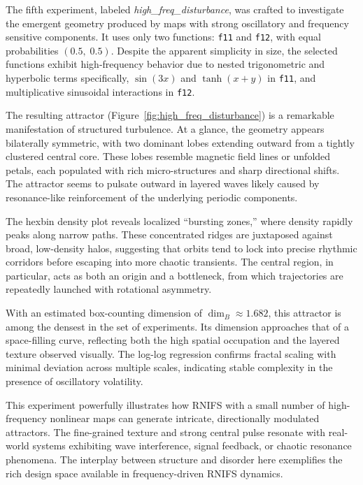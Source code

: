 \documentclass[twocolumn,10pt]{article}
\begin{document}
The fifth experiment, labeled \textit{high\_freq\_disturbance}, was crafted to investigate the emergent geometry produced by maps with strong oscillatory and frequency sensitive components. It uses only two functions: \texttt{f11} and \texttt{f12}, with equal probabilities $(0.5,\; 0.5)$. Despite the apparent simplicity in size, the selected functions exhibit high-frequency behavior due to nested trigonometric and hyperbolic terms specifically, $\sin(3x)$ and $\tanh(x + y)$ in \texttt{f11}, and multiplicative sinusoidal interactions in \texttt{f12}.

The resulting attractor (Figure~\ref{fig:high_freq_disturbance}) is a remarkable manifestation of structured turbulence. At a glance, the geometry appears bilaterally symmetric, with two dominant lobes extending outward from a tightly clustered central core. These lobes resemble magnetic field lines or unfolded petals, each populated with rich micro-structures and sharp directional shifts. The attractor seems to pulsate outward in layered waves likely caused by resonance-like reinforcement of the underlying periodic components.

The hexbin density plot reveals localized “bursting zones,” where density rapidly peaks along narrow paths. These concentrated ridges are juxtaposed against broad, low-density halos, suggesting that orbits tend to lock into precise rhythmic corridors before escaping into more chaotic transients. The central region, in particular, acts as both an origin and a bottleneck, from which trajectories are repeatedly launched with rotational asymmetry.

With an estimated box-counting dimension of $\dim_B \approx 1.682$, this attractor is among the densest in the set of experiments. Its dimension approaches that of a space-filling curve, reflecting both the high spatial occupation and the layered texture observed visually. The log-log regression confirms fractal scaling with minimal deviation across multiple scales, indicating stable complexity in the presence of oscillatory volatility.

This experiment powerfully illustrates how RNIFS with a small number of high-frequency nonlinear maps can generate intricate, directionally modulated attractors. The fine-grained texture and strong central pulse resonate with real-world systems exhibiting wave interference, signal feedback, or chaotic resonance phenomena. The interplay between structure and disorder here exemplifies the rich design space available in frequency-driven RNIFS dynamics.
\end{document}
